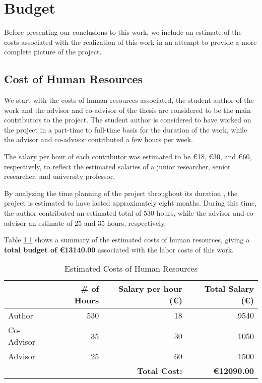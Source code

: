 

\chapter{Budget} \label{chap:budget}

Before presenting our conclusions to this work, we include an estimate of the costs associated with the realization of this work in an attempt to provide a more complete picture of the project.

\section{Cost of Human Resources}

We start with the costs of human resources associated, the student author of the work and the advisor and co-advisor of the thesis are considered to be the main contributors to the project. The student author is considered to have worked on the project in a part-time to full-time basis for the duration of the work, while the advisor and co-advisor contributed a few hours per week. 

The salary per hour of each contributor was estimated to be €18, €30, and €60, respectively, to reflect the estimated salaries of a junior researcher, senior researcher, and university professor.

By analyzing the time planning of the project throughout its duration , the project is estimated to have lasted approximately eight months. During this time, the author contributed an estimated total of 530 hours, while the advisor and co-advisor an estimate of 25 and 35 hours, respectively. 

Table \ref{tab:budget-human_resources} shows a summary of the estimated costs of human resources, giving a \textbf{total budget of €13140.00} associated with the labor costs of this work.

\begin{table}[h]
    \centering
    \caption{Estimated Costs of Human Resources}
    \label{tab:budget-human_resources}
    \begin{tabular}{lrrr}
    \toprule
    {} &  \# of Hours &  Salary per hour (€) &  Total Salary (€) \\
    \midrule
    Author  &                   530 &                   18 &         9540 \\
    Co-Advisor &                35 &                    30 &         1050 \\
    Advisor &                   25 &                    60 &         1500 \\
    \bottomrule
    {} &  {} & \textbf{Total Cost:} & \textbf{€12090.00} \\
    \end{tabular}
\end{table}

